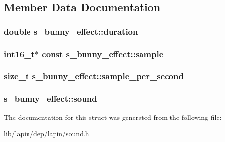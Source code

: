 \subsection{Member Data Documentation}
\hypertarget{structs__bunny__effect_ae7b38147c77defa25b4f26d5c4ac1eb0}{
\subsubsection[{duration}]{ double s\-\_\-bunny\-\_\-effect\-::duration}}\label{structs__bunny__effect_ae7b38147c77defa25b4f26d5c4ac1eb0}
\hypertarget{structs__bunny__effect_ae4f9bef6b6a6017a1109a67d2aeb962a}{
\subsubsection[{sample}]{\setlength{\rightskip}{0pt plus 5cm}int16\-\_\-t$\ast$ {\bf const} s\-\_\-bunny\-\_\-effect\-::sample}}\label{structs__bunny__effect_ae4f9bef6b6a6017a1109a67d2aeb962a}
\hypertarget{structs__bunny__effect_a81d7eb8e57b6dd5a8a0ad8638fdc35ff}{
\subsubsection[{sample\-\_\-per\-\_\-second}]{ {\bf size\-\_\-t} s\-\_\-bunny\-\_\-effect\-::sample\-\_\-per\-\_\-second}}\label{structs__bunny__effect_a81d7eb8e57b6dd5a8a0ad8638fdc35ff}
\hypertarget{structs__bunny__effect_a7bdb04c4b5e7a9f2819dc9fdd44c1682}{
\subsubsection[{sound}]{ s\-\_\-bunny\-\_\-effect\-::sound}}\label{structs__bunny__effect_a7bdb04c4b5e7a9f2819dc9fdd44c1682}


The documentation for this struct was generated from the following file\-:\begin{DoxyCompactItemize}
\item 
lib/lapin/dep/lapin/\hyperlink{sound_8h}{sound.\-h}\end{DoxyCompactItemize}
